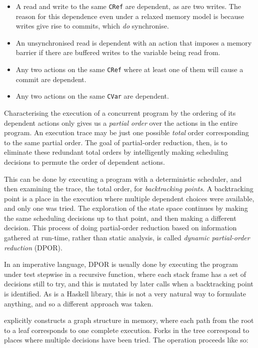 \begin{itemize}
\item A read and write to the same \verb|CRef| are dependent, as are
  two writes. The reason for this dependence even under a relaxed
  memory model is because writes give rise to commits, which \emph{do}
  synchronise.

\item An unsynchronised read is dependent with an action that imposes
  a memory barrier if there are buffered writes to the variable being
  read from.

\item Any two actions on the same \verb|CRef| where at least one of
  them will cause a commit are dependent.

\item Any two actions on the same \verb|CVar| are dependent.
\end{itemize}

Characterising the execution of a concurrent program by the ordering
of its dependent actions only gives us a \emph{partial order} over the
actions in the entire program. An execution trace may be just one
possible \emph{total} order corresponding to the same partial
order. The goal of partial-order reduction, then, is to eliminate
these redundant total orders by intelligently making scheduling
decisions to permute the order of dependent actions.

This can be done by executing a program with a deterministic
scheduler, and then examining the trace, the total order, for
\emph{backtracking points}. A backtracking point is a place in the
execution where multiple dependent choices were available, and only
one was tried. The exploration of the state space continues by making
the same scheduling decisions up to that point, and then making a
different decision. This process of doing partial-order reduction
based on information gathered at run-time, rather than static
analysis, is called \emph{dynamic partial-order reduction} (DPOR).


In an imperative language, DPOR is usually done by executing the
program under test stepwise in a recursive function, where each stack
frame has a set of decisions still to try, and this is mutated by
later calls when a backtracking point is identified. As \dejafu{} is a
Haskell library, this is not a very natural way to formulate anything,
and so a different approach was taken.

\dejafu{} explicitly constructs a graph structure in memory, where
each path from the root to a leaf corresponds to one complete
execution. Forks in the tree correspond to places where multiple
decisions have been tried. The operation proceeds like so:

